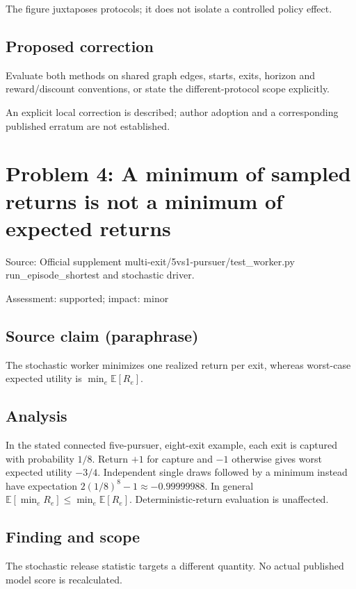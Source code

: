 \documentclass[11pt]{article}
\begin{document}
The figure juxtaposes protocols; it does not isolate a controlled policy effect.

\subsection*{Proposed correction}

Evaluate both methods on shared graph edges, starts, exits, horizon and reward/discount conventions, or state the different-protocol scope explicitly.

An explicit local correction is described; author adoption and a corresponding published erratum are not established.

\section*{Problem 4: A minimum of sampled returns is not a minimum of expected returns}

Source: Official supplement multi-exit/5vs1-pursuer/test\_worker.py run\_episode\_shortest and stochastic driver.

Assessment: supported; impact: minor

\subsection*{Source claim (paraphrase)}

The stochastic worker minimizes one realized return per exit, whereas worst-case expected utility is \(\min_e\mathbb E[R_e]\).

\subsection*{Analysis}

In the stated connected five-pursuer, eight-exit example, each exit is captured with probability \(1/8\). Return \(+1\) for capture and \(-1\) otherwise gives worst expected utility \(-3/4\). Independent single draws followed by a minimum instead have expectation \(2(1/8)^8-1\approx-0.99999988\). In general \(\mathbb E[\min_eR_e]\leq\min_e\mathbb E[R_e]\). Deterministic-return evaluation is unaffected.

\subsection*{Finding and scope}

The stochastic release statistic targets a different quantity. No actual published model score is recalculated.
\end{document}
